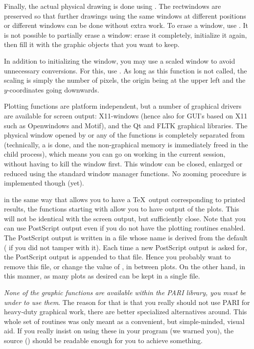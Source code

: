    Finally, the actual physical drawing is done using . The
rectwindows are preserved so that further drawings using the same windows at
different positions or different windows can be done without extra work. To
erase a window, use . It is not possible to partially erase a
window: erase it completely, initialize it again, then fill it with the
graphic objects that you want to keep.

   In addition to initializing the window, you may use a scaled window to
avoid unnecessary conversions. For this, use . As long as this
function is not called, the scaling is simply the number of pixels, the
origin being at the upper left and the $y$-coordinates going downwards.

   Plotting functions are platform independent, but a number of graphical
drivers are available for screen output: X11-windows (hence also for GUI's
based on X11 such as Openwindows and Motif), and the Qt and FLTK graphical
libraries. The physical window opened by  or any of the
 functions is completely separated from  (technically, a
 is done, and the non-graphical memory is immediately freed in the
child process), which means you can go on working in the current 
session, without having to kill the window first. This window can be closed,
enlarged or reduced using the standard window manager functions. No zooming
procedure is implemented though (yet).

 in the same way that  allows you to have a \TeX\ output
corresponding to printed results, the functions starting with  allow
you to have  output of the plots. This will not be identical
with the screen output, but sufficiently close. Note that you can use
PostScript output even if you do not have the plotting routines enabled. The
PostScript output is written in a file whose name is derived from the
 default ( if you did not tamper with it). Each
time a new PostScript output is asked for, the PostScript output is appended
to that file. Hence you probably want to remove this file, or change the
value of , in between plots. On the other hand, in this manner,
as many plots as desired can be kept in a single file. \smallskip

 \emph{None of the graphic functions are available
within the PARI library, you must be under  to use them}. The reason
for that is that you really should not use PARI for heavy-duty graphical work,
there are better specialized alternatives around. This whole set of routines
was only meant as a convenient, but simple-minded, visual aid. If you really
insist on using these in your program (we warned you), the source
() should be readable enough for you to achieve something.



